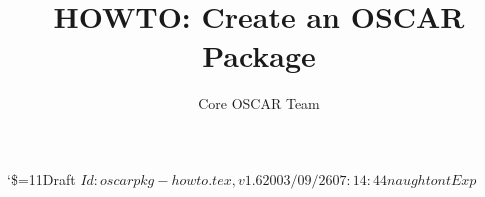 \documentclass[letterpaper]{article}
\title{HOWTO: Create an OSCAR Package}
\author{Core OSCAR Team}
\begin{document}
\maketitle

\begin{center}
  {\catcode`\$=11\tiny\noindent Draft $Id: oscarpkg-howto.tex,v 1.6 2003/09/26 07:14:44 naughtont Exp $}
\end{center}
















%
%


%
%
\newpage   %
\appendix








%
\end{document}
